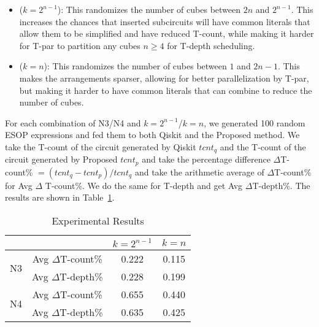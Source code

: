 \begin{itemize}
\item ($k=2^{n-1}$): This randomizes the number of cubes between $2n$ and $2^{n-1}$. This increases the chances that inserted subcircuits will have common literals that allow them to be simplified and have reduced T-count, while making it harder for T-par to partition any cubes $n \geq 4$ for T-depth scheduling.
\item ($k=n$): This randomizes the number of cubes between $1$ and $2n-1$. This makes the arrangements sparser, allowing for better parallelization by T-par, but making it harder to have common literals that can combine to reduce the number of cubes.
\end{itemize}

For each combination of N3/N4 and $k=2^{n-1}$/$k=n$, we generated 100 random ESOP expressions and fed them
to both Qiskit and the Proposed method. We take the T-count of the circuit generated by Qiskit $tcnt_q$ and
the T-count of the circuit generated by Proposed $tcnt_p$ and take the percentage difference
$\Delta$T-count\% $= (tcnt_q - tcnt_p) / tcnt_q$ and take the arithmetic average of $\Delta$T-count\% for
Avg $\Delta$ T-count\%. We do the same for T-depth and get Avg $\Delta$T-depth\%. The results are
shown in Table~\ref{table-results}.

\begin{table}[t]
  \begin{center}
    \scalebox{1.2} {
      \begin{tabular}{c|c|c|c}\hline
                            &                   & $k=2^{n-1}$ & $k=n$    \\\hline
        \multirow{2}{*}{N3} & Avg $\Delta$T-count\% &  0.222      & 0.115    \\\cline{2-4}
                            & Avg $\Delta$T-depth\% &  0.228      & 0.199    \\\hline
        \multirow{2}{*}{N4} & Avg $\Delta$T-count\% &  0.655      & 0.440    \\\cline{2-4}
                            & Avg $\Delta$T-depth\% &  0.635      & 0.425    \\\hline

      \end{tabular}        
    }
  \end{center}
  \caption{Experimental Results}
  \label{table-results}
  \vspace{-0.5cm}
\end{table}

